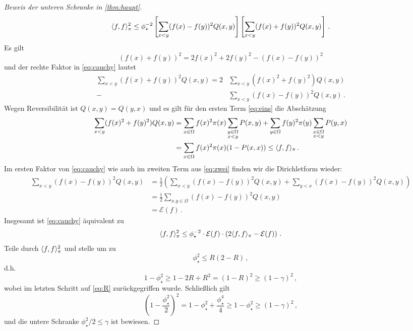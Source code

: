 \documentclass[ngerman,a4paper,11pt]{scrartcl}
\newcommand{\diri}{\mathcal{E}}
\DeclarePairedDelimiter{\sprod}{\langle}{\rangle}	%
\begin{document}
\begin{proof}[Beweis der unteren Schranke in \cref{thm:haupt}]
\begin{equation}
  \label{eq:cauchy}
  \sprod{f,f}_\pi^2\leq\phi_\star^{-2}\left[ \sum_{x<y}(f(x)-f(y))^2Q(x,y) \right]\left[ \sum_{x<y}(f(x)+f(y))^2Q(x,y) \right]\, .
 \end{equation}
 Es gilt
 \begin{equation*}
  (f(x)+f(y))^2=2f(x)^2+2f(y)^2-(f(x)-f(y))^2 
 \end{equation*}
 und der rechte Faktor in \cref{eq:cauchy} lautet
 \begin{align}
  \sum_{x<y}(f(x)+f(y))^2Q(x,y)=2&\sum_{x<y}(f(x)^2+f(y)^2)Q(x,y) \label{eq:eins} \\
  -&\sum_{x<y}(f(x)-f(y))^2Q(x,y)\, . \label{eq:zwei}
 \end{align}
 Wegen Reversibilität ist $Q(x,y)=Q(y,x)$ und es gilt für den ersten Term
 \eqref{eq:eins} die Abschätzung
 \begin{align*}
  \sum_{x<y}(f(x)^2+f(y)^2)Q(x,y)&=\sum_{x\in\Omega}f(x)^2\pi(x)\sum_{\substack{y\in\Omega\\x<y}}P(x,y)+\sum_{y\in\Omega}f(y)^2\pi(y)\sum_{\substack{x\in\Omega\\x<y}}P(y,x) \\
  &=\sum_{x\in\Omega}f(x)^2\pi(x)(1-P(x,x))\leq\sprod{f,f}_\pi \, .
 \end{align*}
 Im ersten Faktor von \cref{eq:cauchy} wie auch im zweiten Term aus
 \cref{eq:zwei} finden wir die Dirichletform wieder:
 \begin{align*}
  \sum_{x<y}(f(x)-f(y))^2Q(x,y)&=\frac{1}{2}\left( \sum_{x<y}(f(x)-f(y))^2Q(x,y)+\sum_{y<x}(f(x)-f(y))^2Q(x,y)\right)\\
  &=\frac{1}{2}\sum_{x.y\in\Omega}(f(x)-f(y))^2Q(x,y) \\
  &=\diri(f)\, .
 \end{align*}
 Insgesamt ist \cref{eq:cauchy} äquivalent zu
 \begin{equation*}
  \sprod{f,f}_\pi^2\leq\phi_\star^{-2}\cdot\diri(f)\cdot \left(2\sprod{f,f}_\pi-\diri(f)\right) \, .
 \end{equation*}
 Teile durch $\sprod{f,f}_\pi^2$ und stelle um zu
 \begin{equation*}
  \phi_\star^2\leq R(2-R)\, ,
 \end{equation*}
 d.h.
 \begin{equation*}
  1-\phi_\star^2\geq1-2R+R^2=(1-R)^2\geq(1-\gamma)^2\, , 
 \end{equation*}
 wobei im letzten Schritt auf \cref{eq:R} zurückgegriffen wurde. Schließlich gilt
 \begin{equation*}
  \left( 1-\frac{\phi_\star^2}{2} \right)^2=1-\phi_\star^2+\frac{\phi_\star^4}{4}\geq 1-\phi_\star^2\geq (1-\gamma)^2\, , 
 \end{equation*}
 und die untere Schranke $\phi_\star^2/2\leq\gamma$ ist bewiesen.
\end{proof}
\printbibliography
\end{document}
